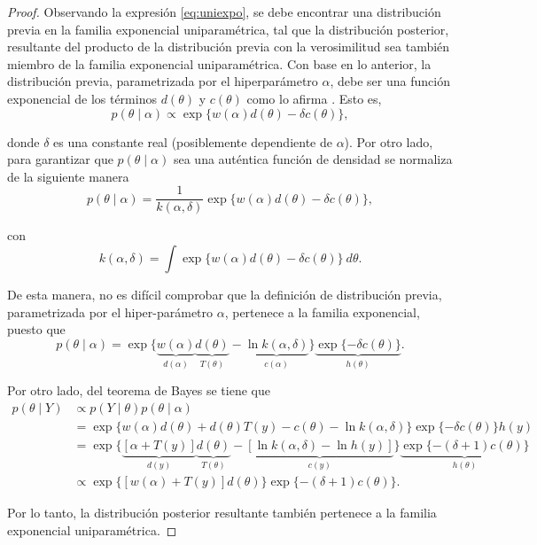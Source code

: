 \documentclass[
  10pt,
  spanish,
]{book}
\theoremstyle{definition}
\theoremstyle{definition}
\theoremstyle{definition}
\theoremstyle{definition}
\theoremstyle{remark}
\begin{document}
\begin{proof}
{}Observando la expresión \eqref{eq:uniexpo}, se debe encontrar una distribución previa en la familia exponencial uniparamétrica, tal que la distribución posterior, resultante del producto de la distribución previa con la verosimilitud sea también miembro de la familia exponencial uniparamétrica. Con base en lo anterior, la distribución previa, parametrizada por el hiperparámetro \(\alpha\), debe ser una función exponencial de los términos \(d(\theta)\) y \(c(\theta)\) como lo afirma \citet{Jordan}. Esto es,
\begin{equation}
p(\theta \mid \alpha)\propto\exp\{w(\alpha) d(\theta)-\delta c(\theta)\},
\end{equation}

donde \(\delta\) es una constante real (posiblemente dependiente de \(\alpha\)). Por otro lado, para garantizar que \(p(\theta \mid \alpha)\) sea una auténtica función de densidad se normaliza de la siguiente manera
\begin{equation}
p(\theta \mid \alpha)=\frac{1}{k(\alpha,\delta)}\exp\{w(\alpha) d(\theta)-\delta c(\theta)\},
\end{equation}

con
\begin{equation*}
k(\alpha,\delta)=\int\exp\{w(\alpha) d(\theta)-\delta c(\theta)\} \ d\theta.
\end{equation*}

De esta manera, no es difícil comprobar que la definición de distribución previa, parametrizada por el hiper-parámetro \(\alpha\), pertenece a la familia exponencial, puesto que
\begin{equation}
p(\theta \mid \alpha)=\exp\{\underbrace{w(\alpha)}_{d(\alpha)} \underbrace{d(\theta)}_{T(\theta)} - \underbrace{\ln k(\alpha,\delta)}_{c(\alpha)}\}\underbrace{\exp\{-\delta c(\theta)\}}_{h(\theta)}.
\end{equation}

Por otro lado, del teorema de Bayes se tiene que
\begin{align*}
p(\theta \mid Y) &\propto p(Y \mid \theta)p(\theta \mid \alpha)\\
&=\exp\{w(\alpha) d(\theta) + d(\theta)T(y) - c(\theta) -\ln k(\alpha,\delta) \}\exp\{-\delta c(\theta)\}h(y)\\
&=\exp\{\underbrace{[\alpha+T(y)]}_{d(y)} \underbrace{d(\theta)}_{T(\theta)} -\underbrace{[\ln k(\alpha,\delta)-\ln h(y)]}_{c(y)}\} \underbrace{\exp\{-(\delta+1) c(\theta)\}}_{h(\theta)}\\
&\propto \exp\{[w(\alpha)+T(y)] d(\theta)\}\exp\{-(\delta+1) c(\theta)\}.
\end{align*}

Por lo tanto, la distribución posterior resultante también pertenece a la familia exponencial uniparamétrica.
\end{proof}
\end{document}
